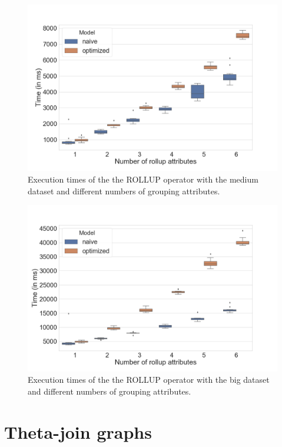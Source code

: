 \documentclass[a4paper,10pt]{IEEEtran}
\begin{document}
\begin{figure}[!ht]
    \centering
    \includegraphics[width=\linewidth]{"Rollup_medium.png"}
    \caption{Execution times of the the ROLLUP operator with the medium dataset and different numbers of grouping attributes.}
    \label{fig:Rollup-medium}
\end{figure}

\begin{figure}[!ht]
    \centering
    \includegraphics[width=\linewidth]{"Rollup_big.png"}
    \caption{Execution times of the the ROLLUP operator with the big dataset and different numbers of grouping attributes.}
    \label{fig:Rollup-big}
\end{figure}

\clearpage

\section*{Theta-join graphs}
\end{document}
